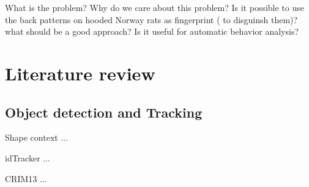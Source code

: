 \documentclass[conference]{IEEEtran}
\begin{document}




What is the problem?
Why do we care about this problem?
Is it possible to use the back patterns on hooded Norway rats as fingerprint ( to disguinsh them)?
what should be a good approach?
Is it useful for automatic behavior analysis?



\section{Literature review}
\subsection{Object detection and Tracking}
Shape context \cite{belongie2002shape} ...

idTracker \cite{perez2014idtracker}...

CRIM13 \cite{CRIM13}...


  

\end{document}
